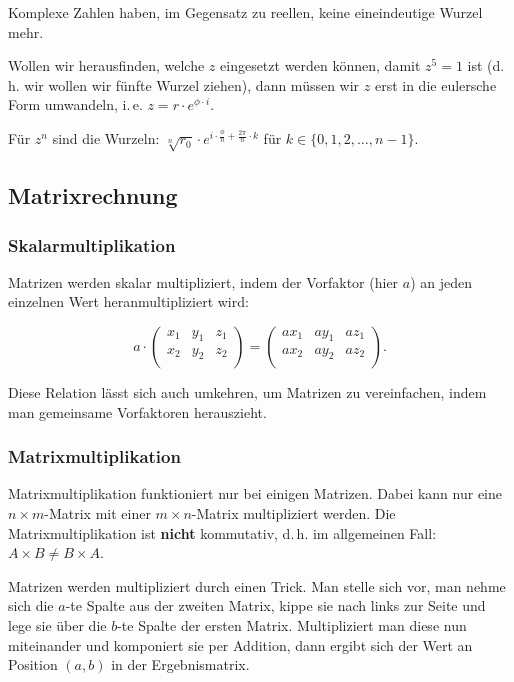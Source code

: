 \documentclass{scrartcl}
\begin{document}
Komplexe Zahlen haben, im Gegensatz zu reellen, keine eineindeutige Wurzel mehr.

Wollen wir herausfinden, welche $z$ eingesetzt werden können, damit $z^5 = 1$ ist (d.\,h. wir wollen wir fünfte Wurzel ziehen),
dann müssen wir $z$ erst in die eulersche Form umwandeln, i.\,e. $z = r\cdot e^{\phi \cdot i}$.

Für $z^n$ sind die Wurzeln: $\sqrt[n]{r_0} \cdot e^{i \cdot \frac{\phi}{n} + \frac{2\pi}{n}\cdot k}$ für $k \in \{0, 1, 2, \dots, n - 1\}$.

\subsection{Matrixrechnung}

\subsubsection{Skalarmultiplikation}

Matrizen werden skalar multipliziert, indem der Vorfaktor (hier $a$) an jeden einzelnen Wert
heranmultipliziert wird:

\begin{equation}
	a \cdot \begin{pmatrix*}
		x_1 & y_1 & z_1\\
		x_2 & y_2 & z_2\\
	\end{pmatrix*} = \begin{pmatrix*}
		ax_1 & ay_1 & az_1\\
		ax_2 & ay_2 & az_2\\
	\end{pmatrix*}.
\end{equation}

Diese Relation lässt sich auch umkehren, um Matrizen zu vereinfachen, indem man gemeinsame Vorfaktoren herauszieht.

\subsubsection{Matrixmultiplikation}

Matrixmultiplikation funktioniert nur bei einigen Matrizen. Dabei kann nur eine $n\times m$-Matrix mit einer
$m\times n$-Matrix multipliziert werden. Die Matrixmultiplikation ist \textbf{nicht} kommutativ, d.\,h. im
allgemeinen Fall: $A \times B \not= B\times A$.

Matrizen werden multipliziert durch einen \frq Trick\flq. Man stelle sich vor, man nehme sich die $a$-te Spalte aus
der zweiten Matrix, kippe sie nach links zur Seite und lege sie über die $b$-te Spalte der ersten Matrix.
Multipliziert man diese nun miteinander und komponiert sie per Addition, dann ergibt sich der Wert an Position $(a, b)$
in der Ergebnismatrix.
\end{document}
